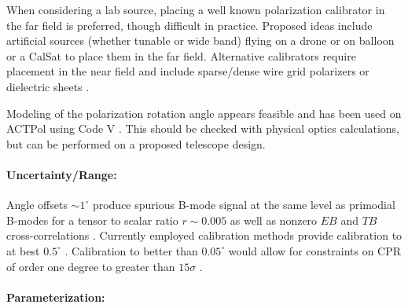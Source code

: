 When considering a lab source, placing a well known polarization
calibrator in the far field is preferred, though difficult in practice.
Proposed ideas include artificial sources \cite{nati_2017} (whether tunable or wide band) flying on a
drone or on balloon or a CalSat to place them in the far field. Alternative calibrators
require placement in the near field and include sparse/dense wire grid
polarizers or dielectric sheets \cite{Takahashi2010, 2016arXiv160701825K}.

Modeling of the polarization rotation angle appears feasible and has been used
on ACTPol using Code V \cite{2016arXiv160701825K}. This should be checked with
physical optics calculations, but can be performed on a proposed telescope
design.

\paragraph{Uncertainty/Range:}

Angle offsets $\sim 1^{\circ}$ produce spurious B-mode signal at the same level
as primodial B-modes for a tensor to scalar ratio $r \sim 0.005$ as well as
nonzero $EB$ and $TB$ cross-correlations \cite{doi:10.1142/S0218271816400125}.
Currently employed calibration methods provide calibration to at best
$0.5^{\circ}$ \cite{2016MNRAS.455.1981K}. Calibration to better than
$0.05^{\circ}$ would allow for constraints on CPR of order one degree to
greater than $15\sigma$ \cite{2016MNRAS.455.1981K}.

\paragraph{Parameterization:}
